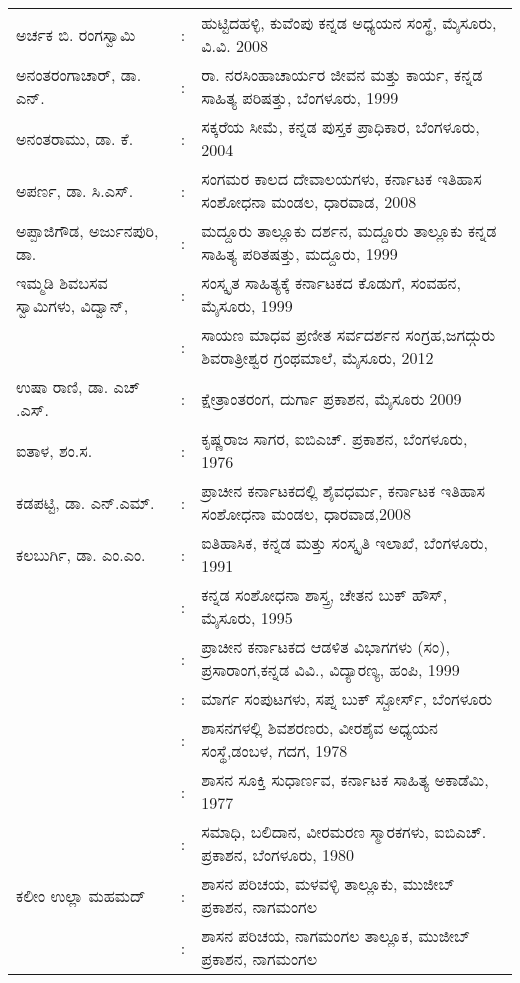 \begin{longtable}[l]{@{}>{\raggedright}p{4.7cm}cp{9.2cm}<{\raggedright}@{}}
ಅರ್ಚಕ ಬಿ. ರಂಗಸ್ವಾಮಿ & : & ಹುಟ್ಟಿದಹಳ್ಳಿ, ಕುವೆಂಪು ಕನ್ನಡ ಅಧ್ಯಯನ ಸಂಸ್ಥೆ, ಮೈಸೂರು, ವಿ.ವಿ. 2008\\
ಅನಂತರಂಗಾಚಾರ್​, ಡಾ. ಎನ್​. & : & ರಾ. ನರಸಿಂಹಾಚಾರ್ಯರ ಜೀವನ ಮತ್ತು ಕಾರ್ಯ, ಕನ್ನಡ ಸಾಹಿತ್ಯ ಪರಿಷತ್ತು, ಬೆಂಗಳೂರು, 1999\\
ಅನಂತರಾಮು, ಡಾ. ಕೆ. & : & ಸಕ್ಕರೆಯ ಸೀಮೆ, ಕನ್ನಡ ಪುಸ್ತಕ ಪ್ರಾಧಿಕಾರ, ಬೆಂಗಳೂರು, 2004\\
ಅಪರ್ಣ, ಡಾ. ಸಿ.ಎಸ್​. & : & ಸಂಗಮರ ಕಾಲದ ದೇವಾಲಯಗಳು, ಕರ್ನಾಟಕ ಇತಿಹಾಸ ಸಂಶೋಧನಾ ಮಂಡಲ, ಧಾರವಾಡ, 2008\\
ಅಪ್ಪಾಜಿಗೌಡ, ಅರ್ಜುನಪುರಿ, ಡಾ. & : & ಮದ್ದೂರು ತಾಲ್ಲೂಕು ದರ್ಶನ, ಮದ್ದೂರು ತಾಲ್ಲೂಕು ಕನ್ನಡ ಸಾಹಿತ್ಯ ಪರಿತಷತ್ತು, ಮದ್ದೂರು, 1999\\
ಇಮ್ಮಡಿ ಶಿವಬಸವ ಸ್ವಾಮಿಗಳು, ವಿದ್ವಾನ್​, & : & ಸಂಸ್ಕೃತ ಸಾಹಿತ್ಯಕ್ಕೆ ಕರ್ನಾಟಕದ ಕೊಡುಗೆ, ಸಂವಹನ, ಮೈಸೂರು, 1999\\[-15pt]
 & : & ಸಾಯಣ ಮಾಧವ ಪ್ರಣೀತ ಸರ್ವದರ್ಶನ ಸಂಗ್ರಹ,\newline ಜಗದ್ಗುರು ಶಿವರಾತ್ರೀಶ್ವರ ಗ್ರಂಥಮಾಲೆ, ಮೈಸೂರು, 2012\\
ಉಷಾ ರಾಣಿ, ಡಾ. ಎಚ್​.ಎಸ್​. & : & ಕ್ಷೇತ್ರಾಂತರಂಗ, ದುರ್ಗಾ ಪ್ರಕಾಶನ, ಮೈಸೂರು 2009\\
ಐತಾಳ, ಶಂ.ಸ. & : & ಕೃಷ್ಣರಾಜ ಸಾಗರ, ಐಬಿಎಚ್​. ಪ್ರಕಾಶನ, ಬೆಂಗಳೂರು, 1976\\
ಕಡಪಟ್ಟಿ, ಡಾ. ಎನ್​.ಎಮ್. & : & ಪ್ರಾಚೀನ ಕರ್ನಾಟಕದಲ್ಲಿ ಶೈವಧರ್ಮ, ಕರ್ನಾಟಕ ಇತಿಹಾಸ ಸಂಶೋಧನಾ ಮಂಡಲ, ಧಾರವಾಡ,2008\\
ಕಲಬುರ್ಗಿ, ಡಾ. ಎಂ.ಎಂ.  & : & ಐತಿಹಾಸಿಕ, ಕನ್ನಡ ಮತ್ತು ಸಂಸ್ಕೃತಿ ಇಲಾಖೆ, ಬೆಂಗಳೂರು, 1991\\
                 & : & ಕನ್ನಡ ಸಂಶೋಧನಾ ಶಾಸ್ತ್ರ, ಚೇತನ ಬುಕ್​ ಹೌಸ್​, ಮೈಸೂರು, 1995\\
                 & : & ಪ್ರಾಚೀನ ಕರ್ನಾಟಕದ ಆಡಳಿತ ವಿಭಾಗಗಳು (ಸಂ), ಪ್ರಸಾರಾಂಗ,\newline ಕನ್ನಡ ವಿವಿ., ವಿದ್ಯಾರಣ್ಯ, ಹಂಪಿ, 1999\\
                 & : & ಮಾರ್ಗ ಸಂಪುಟಗಳು, ಸಪ್ನ ಬುಕ್​ ಸ್ಟೋರ್ಸ್, ಬೆಂಗಳೂರು \\
                 & : & ಶಾಸನಗಳಲ್ಲಿ ಶಿವಶರಣರು, ವೀರಶೈವ ಅಧ್ಯಯನ ಸಂಸ್ಥೆ,\newline ಡಂಬಳ, ಗದಗ, 1978\\
                 & : & ಶಾಸನ ಸೂಕ್ತಿ ಸುಧಾರ್ಣವ, ಕರ್ನಾಟಕ ಸಾಹಿತ್ಯ ಅಕಾಡೆಮಿ, 1977\\
                 & : & ಸಮಾಧಿ, ಬಲಿದಾನ, ವೀರಮರಣ ಸ್ಮಾರಕಗಳು, ಐಬಿಎಚ್​. ಪ್ರಕಾಶನ, ಬೆಂಗಳೂರು, 1980\\
ಕಲೀಂ ಉಲ್ಲಾ ಮಹಮದ್ & ​: & ಶಾಸನ ಪರಿಚಯ, ಮಳವಳ್ಳಿ ತಾಲ್ಲೂಕು, ಮುಜೀಬ್ ಪ್ರಕಾಶನ, ನಾಗಮಂಗಲ\\
& : & ಶಾಸನ ಪರಿಚಯ, ನಾಗಮಂಗಲ ತಾಲ್ಲೂಕ, ಮುಜೀಬ್ ಪ್ರಕಾಶನ, ನಾಗಮಂಗಲ\\

\end{longtable}
